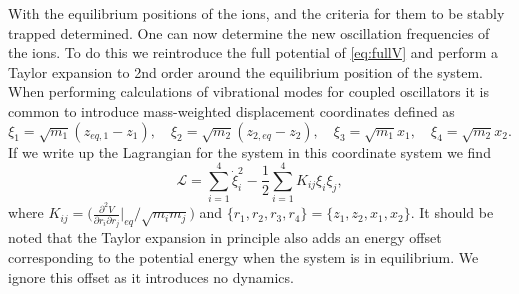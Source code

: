 With the equilibrium positions of the ions, and the criteria for them to be stably trapped determined. One can now determine the new oscillation frequencies of the ions. To do this we reintroduce the full potential of \cref{eq:fullV} and perform a Taylor expansion to 2nd order around the equilibrium position of the system. When performing calculations of vibrational modes for coupled oscillators it is common to introduce mass-weighted displacement coordinates defined as
\begin{equation}
    \xi_1 = \sqrt{m_1}(z_{eq,1}-z_1),\quad \xi_2 = \sqrt{m_2}(z_{2,eq}-z_2),\quad \xi_3 = \sqrt{m_1}x_1,\quad \xi_4 = \sqrt{m_2}x_2.
\end{equation}
If we write up the Lagrangian for the system in this coordinate system we find
\begin{equation}
    \mathcal{L} = \sum_{i=1}^4 \dot{\xi}_i^2 - \frac{1}{2} \sum_{i = 1}^4K_{ij}\xi_i\xi_j,
\end{equation}
where $K_{ij} = \bigg(\frac{\partial^2 V}{\partial r_i\partial r_j}\bigg\vert_{eq}/\sqrt{m_im_j}\bigg)$ and $\{r_1,r_2,r_3,r_4\} = \{z_1,z_2,x_1,x_2\}$. It should be noted that the Taylor expansion in principle also adds an energy offset corresponding to the potential energy when the system is in equilibrium. We ignore this offset as it introduces no dynamics.

